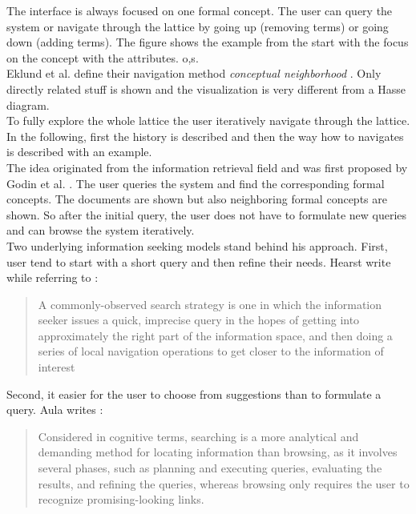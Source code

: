 \documentclass[11pt]{report}
\begin{document}
The interface is always focused on one formal concept. The user can query the system or navigate through the lattice by going up (removing terms) or going down (adding terms). The figure shows the example from the start with the focus on the concept with the attributes. {o,s}. \\ 


Eklund et al. define their navigation method \textit{conceptual neighborhood} \cite{Eklund2009,Eklund2012}. Only directly related stuff is shown and the visualization is very different from a Hasse diagram. \\

To fully explore the whole lattice the user iteratively navigate through the lattice. In the following, first the history is described and then the way how to navigates is described with an example. \\

The idea originated from the information retrieval field and was first proposed by Godin et al. \cite{Godin1989}. The user queries the system and find the corresponding formal concepts. The documents are shown but also neighboring formal concepts are shown. So after the initial query, the user does not have to formulate new queries and can browse the system iteratively. \\

Two underlying information seeking models stand behind his approach. First, user tend to start with a short query and then refine their needs. Hearst \cite{Hearst2009} write  while referring to \cite{Marchionini2006,Bates1990}:
\begin{quote}
	A commonly-observed search strategy is one in which the information seeker issues a quick, imprecise query in the hopes of getting into approximately the right part of the information space, and then doing a series of local navigation operations to get closer to the information of interest
\end{quote}

Second, it easier for the user to choose from suggestions than to formulate a query. Aula writes \cite{Aula2005}:
\begin{quote}
	Considered in cognitive terms, searching is a more analytical and demanding method for locating information than browsing, as it involves several phases, such as planning and executing queries, evaluating the results, and refining the queries, whereas browsing only requires the user to recognize promising-looking links.
\end{quote}
\end{document}
